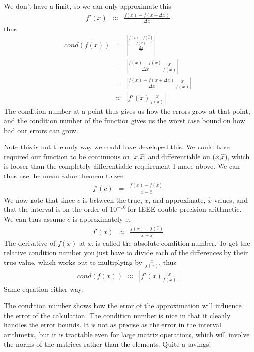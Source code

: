 We don't have a limit, so we can only approximate this
\begin{eqnarray*}
f'(x)&\approx&\frac{f(x)-f(x+\Delta x)}{\Delta x}
\end{eqnarray*}
thus
\begin{eqnarray*}
cond(f(x)) &=& \left|\frac{\frac{f(x)-f(\hat x)}{f(x)}}{\frac{\Delta x}{x}}\right| \\
           &=& \left|\frac{f(x)-f(\hat x)}{\Delta x}\frac{x}{f(x)}\right| \\
           &=& \left|\frac{f(x)-f(x+\Delta x)}{\Delta x}\frac{x}{f(x)}\right| \\
           &\approx& \left|f'(x)\frac{x}{f(x)}\right|
\end{eqnarray*}
The condition number at a point thus gives us how the errors grow at that point, and the condition number of the function gives us the worst case bound on how bad our errors can grow.

Note this is not the only way we could have developed this.  We could have required our
function to be continuous on [$x$,$\hat x$] and differentiable on ($x$,$\hat x$), which is looser than the completely differentiable requirement I made above.  We can thus use the mean value theorem to see
\begin{eqnarray*}
f'(c)&=&\frac{f(x)-f(\hat x)}{x-\hat x}
\end{eqnarray*}
We now note that since $c$ is between the true, $x$, and approximate, $\hat x$ values, and that the interval is on the order of $10^{-16}$ for IEEE double-precision arithmetic.  We can thus assume $c$ is approximately $x$.
\begin{eqnarray*}
f'(x)&\approx&\frac{f(x)-f(\hat x)}{x-\hat x}
\end{eqnarray*}
The derivative of $f(x)$ at $x$, is called the absolute condition number.  To get the relative condition number you just have to divide each of the differences by their true value, which works out to multiplying by $\frac{x}{f(x)}$, thus
\begin{eqnarray*}
cond(f(x)) &\approx& \left|f'(x)\frac{x}{f(x)}\right|
\end{eqnarray*}
Same equation either way.

The condition number shows how the error of the approximation will influence the error of the calculation.    The condition number is nice in that it cleanly handles the error bounds.  It is not as precise as the error in the interval arithmetic, but it is tractable even for large matrix operations, which will involve the norms of the matrices rather than the elements.  Quite a
savings!

